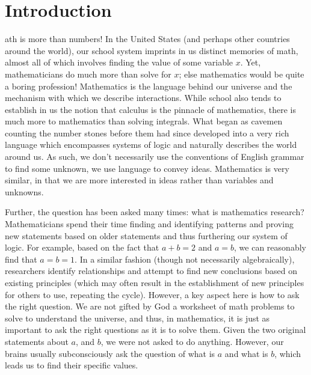 \chapter{Introduction}
ath is more than numbers! In the United States (and perhaps other countries around the world), our school system imprints in us distinct memories of math, almost all of which involves finding the value of some variable $x$. Yet, mathematicians do much more than solve for $x$; else mathematics would be quite a boring profession! Mathematics is the language behind our universe and the mechanism with which we describe interactions.  While school also tends to establish in us the notion that calculus is the pinnacle of mathematics, there is much more to mathematics than solving integrals. What began as cavemen counting the number stones before them had since developed into a very rich language which encompasses systems of logic and naturally describes the world around us. As such, we don't necessarily use the conventions of English grammar to find some unknown, we use language to convey ideas. Mathematics is very similar, in that we are more interested in ideas rather than variables and unknowns. 

Further, the question has been asked many times: what is mathematics research? Mathematicians spend their time finding and identifying patterns and proving new statements based on older statements and thus furthering our system of logic. For example, based on the fact that $a + b = 2$ and $a = b$, we can reasonably find that $a = b = 1$. In a similar fashion (though not necessarily algebraically), researchers identify relationships and attempt to find new conclusions based on existing principles (which may often result in the establishment of new principles for others to use, repeating the cycle). However, a key aspect here is how to ask the right question. We are not gifted by God a worksheet of math problems to solve to understand the universe, and thus, in mathematics, it is just as important to ask the right questions as it is to solve them. Given the two original statements about $a$, and $b$, we were not asked to do anything. However, our brains usually subconsciously ask the question of what is $a$ and what is $b$, which leads us to find their specific values. 

